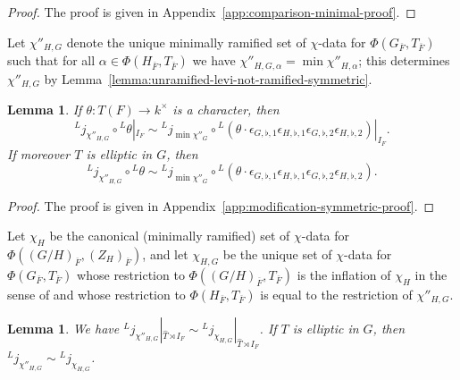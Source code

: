 \documentclass[reqno]{amsart}
\numberwithin{equation}{subsection}
\newcommand{\ol}[1]{\overline{#1}}
\newcommand{\wh}[1]{\widehat{#1}}
\newcommand{\co}{\colon}
\newcommand{\ld}{{}^L}
\newtheorem{lemma}[thm]{Lemma}
\theoremstyle{remark}
\numberwithin{equation}{subsection}
\numberwithin{figure}{subsection}
\begin{document}
\begin{proof}
The proof is given in Appendix~\ref{app:comparison-minimal-proof}.
\end{proof}

Let $\chi''_{H,G}$ denote the unique minimally ramified set of $\chi$-data for $\Phi(G_{\ol F}, T_{\ol F})$ such that for all $\alpha \in \Phi(H_{\ol F}, T_{\ol F})$ we have $\chi''_{H,G,\alpha} = \min \chi''_{H,\alpha}$; this determines $\chi''_{H,G}$ by Lemma~\ref{lemma:unramified-levi-not-ramified-symmetric}.

\begin{lemma}\label{lemma:modification-of-symmetric-ramified-chi-data}
If $\theta\co T(F) \to k^\times$ is a character, then
\[
\ld j_{\chi''_{H,G}} \circ \ld\theta|_{I_F} \sim \ld j_{\min\chi''_G} \circ \ld(\theta \cdot \epsilon_{G,\flat,1}\epsilon_{H,\flat,1}\epsilon_{G,\flat,2}\epsilon_{H,\flat,2})|_{I_F}.
\]
If moreover $T$ is elliptic in $G$, then
\[
\ld j_{\chi''_{H,G}} \circ \ld\theta \sim \ld j_{\min\chi''_G} \circ \ld(\theta \cdot \epsilon_{G,\flat,1}\epsilon_{H,\flat,1}\epsilon_{G,\flat,2}\epsilon_{H,\flat,2}).
\]
\end{lemma}

\begin{proof}
The proof is given in Appendix~\ref{app:modification-symmetric-proof}.
\end{proof}

Let $\chi_H$ be the canonical (minimally ramified) set of $\chi$-data for $\Phi((G/H)_{\ol F}, (Z_H)_{\ol F})$, and let $\chi_{H,G}$ be the unique set of $\chi$-data for $\Phi(G_{\ol F}, T_{\ol F})$ whose restriction to $\Phi((G/H)_{\ol F}, T_{\ol F})$ is the inflation of $\chi_H$ in the sense of \cite[Definition 5.16]{Kal21a} and whose restriction to $\Phi(H_{\ol F}, T_{\ol F})$ is equal to the restriction of $\chi''_{H,G}$.

\begin{lemma}\label{lemma:inflation-change}
We have $\ld j_{\chi''_{H,G}}|_{\wh T \rtimes I_F} \sim \ld j_{\chi_{H,G}}|_{\wh T \rtimes I_F}$. If $T$ is elliptic in $G$, then $\ld j_{\chi''_{H,G}} \sim \ld j_{\chi_{H,G}}$.
\end{lemma}
\end{document}
